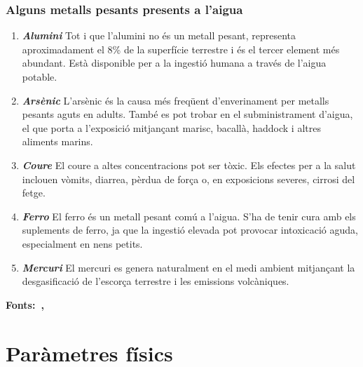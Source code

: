 \subsubsection{Alguns metalls pesants presents a l'aigua}
\begin{enumerate}
 \item \textit{\textbf{Alumini}}
 Tot i que l'alumini no és un metall pesant, representa aproximadament el 8\% de la superfície terrestre i és el tercer element més abundant. Està disponible per a la ingestió humana a través de l'aigua potable.

 \item \textit{\textbf{Arsènic}}
 L'arsènic és la causa més freqüent d'enverinament per metalls pesants aguts en adults. També es pot trobar en el subministrament d'aigua, el que porta a l'exposició mitjançant marisc, bacallà, haddock i altres aliments marins.

 \item \textit{\textbf{Coure}}
 El coure a altes concentracions pot ser tòxic. Els efectes per a la salut inclouen vòmits, diarrea, pèrdua de força o, en exposicions severes, cirrosi del fetge.

 \item \textit{\textbf{Ferro}}
 El ferro és un metall pesant comú a l'aigua. S'ha de tenir cura amb els suplements de ferro, ja que la ingestió elevada pot provocar intoxicació aguda, especialment en nens petits.

 \item \textit{\textbf{Mercuri}}
 El mercuri es genera naturalment en el medi ambient mitjançant la desgasificació de l'escorça terrestre i les emissions volcàniques.
\end{enumerate}

\textbf{Fonts:~\cite{WikiMetales},~\cite{carbotecnia}}

\section{Paràmetres físics} \label{sec:pf}

